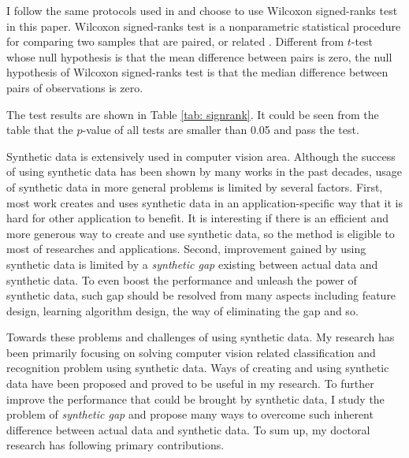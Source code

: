 \documentclass{iitthesis}
\begin{document}
I follow the same protocols used in \cite{demvsar2006statistical}\cite{chen2010ramoboost}\cite{barua2014mwmote} and choose to use Wilcoxon signed-ranks test in this paper. Wilcoxon signed-ranks test is a nonparametric statistical procedure for comparing two samples that are paired, or related \cite{GC09}. Different from $t$-test \cite{BF:08}\cite{zimmerman1997teacher}\cite{demvsar2006statistical} whose null hypothesis is that the mean difference between pairs is zero, the null hypothesis of Wilcoxon signed-ranks test is that the median difference between pairs of observations is zero.

The test results are shown in Table \ref{tab: signrank}. It could be seen from the table that the $p$-value of all tests are smaller than 0.05 and pass the test. 



\clearpage

 \label{chapter: conclusion}

Synthetic data is extensively used in computer vision area. Although the success of using synthetic data has been shown by many works in the past decades, usage of synthetic data in more general problems is limited by several factors. First, most work creates and uses synthetic data in an application-specific way that it is hard for other application to benefit. It is interesting if there is an efficient and more generous way to create and use synthetic data, so the method is eligible to most of researches and applications. Second, improvement gained by using synthetic data is limited by a \textit{synthetic gap} existing between actual data and synthetic data. To even boost the performance and unleash the power of synthetic data, such gap should be resolved from many aspects including feature design, learning algorithm design, the way of eliminating the gap and so.

Towards these problems and challenges of using synthetic data. My research has been primarily focusing on solving computer vision related classification and recognition problem using synthetic data. Ways of creating and using synthetic data have been proposed and proved to be useful in my research. To further improve the performance that could be brought by synthetic data, I study the problem of \textit{synthetic gap} and propose many ways to overcome such inherent difference between actual data and synthetic data. To sum up, my doctoral research has following primary contributions.
\end{document}
